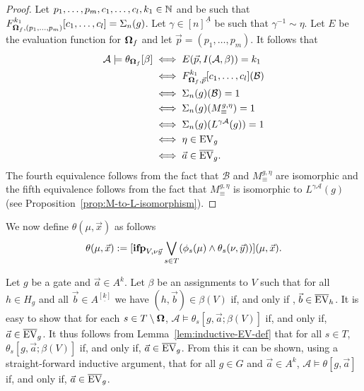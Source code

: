 \documentclass[../main/thesis.tex]{subfiles}
\begin{document}
\begin{proof}
  Let $p_1, \ldots, p_m, c_1, \ldots, c_l, k_1 \in \mathbb{N}$ and be such that
  $F^{k_1}_{\mathbf{\mathbf{\Omega}}_f, (p_1, \ldots, p_{m})}[c_1, \ldots, c_l] = \Sigma_n(g)$.
  Let $\gamma \in [n]^{\underline{A}}$ be such that $\gamma^{-1} \sim \eta$. Let
  $E$ be the evaluation function for $\mathbf{\mathbf{\Omega}}_f$ and let $\vec{p} = (p_1, \ldots,
  p_m)$. It follows that
  \begin{align*}
    \mathcal{A} \models \theta_{\mathbf{\mathbf{\Omega}}_f}[\beta] & \iff E(\vec{p}, I(\mathcal{A}, \beta)) = k_1\\ & \iff F^{k_1}_{\mathbf{\mathbf{\Omega}}_f, \vec{p}}[c_1, \ldots, c_l] (\mathcal{B}) \\ &\iff \Sigma_n(g) (\mathcal{B}) = 1\\ & \iff \Sigma_n(g)(M^{g, \eta}_{\equiv}) = 1 \\ & \iff \Sigma_n(g)(L^{\gamma \mathcal{A}}(g)) = 1 \\ & \iff \eta \in \text{EV}_g \\ & \iff \vec{a} \in \overline{\text{EV}}_g.
  \end{align*}
  The fourth equivalence follows from the fact that $\mathcal{B}$ and $M^{g,
    \eta}_\equiv$ are isomorphic and the fifth equivalence follows from the fact
  that $M^{g, \eta}_{\equiv}$ is isomorphic to $L^{\gamma \mathcal{A}}(g)$ (see
  Proposition~\ref{prop:M-to-L-isomorphism}).
  
\end{proof}

We now define $\theta(\mu, \vec{x})$ as follows
\begin{align*}
  \theta (\mu, \vec{x}) := [\text{\textbf{ifp}}_{V,\nu \vec{y}} \bigvee_{s \in T} (\phi_s(\mu) \land \theta_s (\nu, \vec{y} ))] (\mu, \vec{x}).
\end{align*}

Let $g$ be a gate and $\vec{a} \in A^k$. Let $\beta$ be an assignments to $V$
such that for all $h \in H_g$ and all $\vec{b} \in A^{\underline{[k]}}$ we have
$(h, \vec{b}) \in \beta(V)$ if, and only if , $\vec{b} \in \overline{\text{EV}}_h$. It
is easy to show that for each $s \in T \setminus \mathbf{\mathbf{\Omega}}$, $\mathcal{A} \models
\theta_s[g, \vec{a}; \beta(V)]$ if, and only if, $\vec{a} \in \overline{\text{EV}}_g$.
It thus follows from Lemma~\ref{lem:inductive-EV-def} that for all $s \in T$,
$\theta_s[g, \vec{a}; \beta(V)]$ if, and only if, $\vec{a} \in
\overline{\text{EV}}_g$. From this it can be shown, using a straight-forward inductive
argument, that for all $g \in G$ and $\vec{a} \in A^k$, $\mathcal{A} \models
\theta[g, \vec{a}]$ if, and only if, $\vec{a} \in \overline{\text{EV}}_g$.
\end{document}

